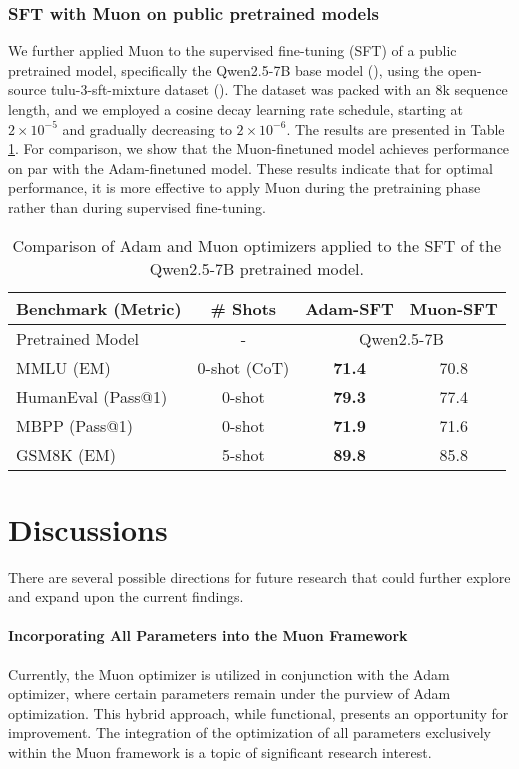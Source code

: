 \subsubsection{SFT with Muon on public pretrained models}

We further applied Muon to the supervised fine-tuning (SFT) of a public pretrained model, specifically the Qwen2.5-7B base model (\cite{qwen2.5}), using the open-source tulu-3-sft-mixture dataset (\cite{lambert2024tulu3}). The dataset was packed with an 8k sequence length, and we employed a cosine decay learning rate schedule, starting at $2 \times 10^{-5}$ and gradually decreasing to $2 \times 10^{-6}$. The results are presented in Table \ref{tab:public-model-SFT-results}. For comparison, we show that the Muon-finetuned model achieves performance on par with the Adam-finetuned model. These results indicate that for optimal performance, it is more effective to apply Muon during the pretraining phase rather than during supervised fine-tuning.

\begin{table}[ht]
\small
\centering
\caption{Comparison of Adam and Muon optimizers applied to the SFT of the Qwen2.5-7B pretrained model.}
\label{tab:public-model-SFT-results}
\begin{tabular}{l c|c|c}
\toprule
\textbf{Benchmark (Metric)} & \textbf{\# Shots} & \textbf{Adam-SFT} & \textbf{Muon-SFT} \\
\midrule
Pretrained Model & - & \multicolumn{2}{|c}{Qwen2.5-7B} \\
\midrule
MMLU (EM) & 0-shot (CoT) & \textbf{71.4} & 70.8 \\
HumanEval (Pass@1) & 0-shot & \textbf{79.3} & 77.4 \\
MBPP (Pass@1) & 0-shot & \textbf{71.9} & 71.6 \\
GSM8K (EM) & 5-shot & \textbf{89.8} & 85.8 \\
\bottomrule
\end{tabular}
\end{table}



\section{Discussions}

There are several possible directions for future research that could further explore and expand upon the current findings.

\paragraph{Incorporating All Parameters into the Muon Framework}
Currently, the Muon optimizer is utilized in conjunction with the Adam optimizer, where certain parameters remain under the purview of Adam optimization. This hybrid approach, while functional, presents an opportunity for improvement. The integration of the optimization of all parameters exclusively within the Muon framework is a topic of significant research interest.

